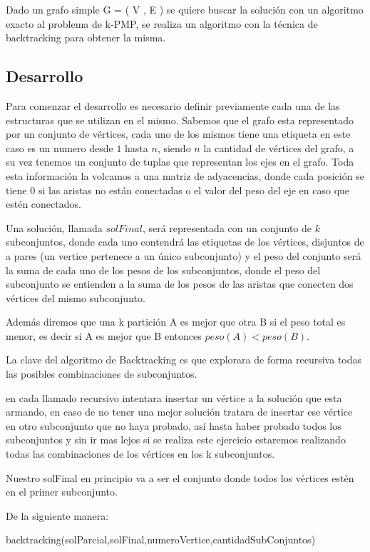 Dado un grafo simple G = ( V , E ) se quiere buscar la solución con un algoritmo exacto al problema de k-PMP, se realiza un algoritmo con la técnica de backtracking para obtener la misma.

\subsection{Desarrollo}

Para comenzar el desarrollo es necesario definir previamente cada una de las estructuras que se utilizan en el mismo. Sabemos que el grafo esta representado por un conjunto de vértices, cada uno de los mismos tiene una etiqueta en este caso es un numero desde $1$ hasta $n$, siendo $n$ la cantidad de vértices del grafo, a su vez tenemos un conjunto de tuplas que representan los ejes en el grafo. Toda esta información la volcamos a una matriz de adyacencias, donde cada posición se tiene 0 si las aristas no están conectadas o el valor del peso del eje en caso que estén conectados.

Una solución, llamada $solFinal$, será representada con un conjunto de $k$ subconjuntos, donde cada uno contendrá las etiquetas de los vértices, disjuntos de a pares (un vertice pertenece a un único subconjunto) y el peso del conjunto será la suma de cada uno de los pesos de los subconjuntos, donde el peso del subconjunto se entienden a la suma de los pesos de las aristas que conecten dos vértices del mismo subconjunto.

Además diremos que una k partición A es mejor que otra B si el peso total es menor, es decir si A es mejor que B entonces $peso(A) < peso(B)$. 

La clave del algoritmo de Backtracking es que explorara de forma recursiva todas las posibles combinaciones de subconjuntos.

en cada llamado recursivo intentara insertar un vértice a la solución que esta armando, en caso de no tener una mejor solución tratara de insertar ese vértice en otro subconjunto que no haya probado, así hasta haber probado todos los subconjuntos y sin ir mas lejos si se realiza este ejercicio estaremos realizando todas las combinaciones de los vértices en los k subconjuntos.	

Nuestro solFinal en principio va a ser el conjunto donde todos los vértices estén en el primer subconjunto.


De la siguiente manera:
\begin{algorithm}
  \begin{algorithmic}[1]\parskip=1mm
 \caption{ backtracking(solParcial,solFinal,numeroVertice,cantidadSubConjuntos)}
  \end{algorithmic}
  \end{algorithm}


